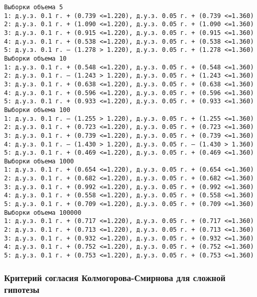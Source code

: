 \documentclass[11pt]{article}
\begin{document}
{\fontsize{11.5}{11}
    \begin{Verbatim}[commandchars=\\\{\}]
Выборки объема 5
1: д.у.з. 0.1 г. + (0.739 <=1.220), д.у.з. 0.05 г. + (0.739 <=1.360)
2: д.у.з. 0.1 г. + (1.090 <=1.220), д.у.з. 0.05 г. + (1.090 <=1.360)
3: д.у.з. 0.1 г. + (0.915 <=1.220), д.у.з. 0.05 г. + (0.915 <=1.360)
4: д.у.з. 0.1 г. + (0.538 <=1.220), д.у.з. 0.05 г. + (0.538 <=1.360)
5: д.у.з. 0.1 г. – (1.278 > 1.220), д.у.з. 0.05 г. + (1.278 <=1.360)
Выборки объема 10
1: д.у.з. 0.1 г. + (0.548 <=1.220), д.у.з. 0.05 г. + (0.548 <=1.360)
2: д.у.з. 0.1 г. – (1.243 > 1.220), д.у.з. 0.05 г. + (1.243 <=1.360)
3: д.у.з. 0.1 г. + (0.638 <=1.220), д.у.з. 0.05 г. + (0.638 <=1.360)
4: д.у.з. 0.1 г. + (0.596 <=1.220), д.у.з. 0.05 г. + (0.596 <=1.360)
5: д.у.з. 0.1 г. + (0.933 <=1.220), д.у.з. 0.05 г. + (0.933 <=1.360)
Выборки объема 100
1: д.у.з. 0.1 г. – (1.255 > 1.220), д.у.з. 0.05 г. + (1.255 <=1.360)
2: д.у.з. 0.1 г. + (0.723 <=1.220), д.у.з. 0.05 г. + (0.723 <=1.360)
3: д.у.з. 0.1 г. + (0.739 <=1.220), д.у.з. 0.05 г. + (0.739 <=1.360)
4: д.у.з. 0.1 г. – (1.430 > 1.220), д.у.з. 0.05 г. – (1.430 > 1.360)
5: д.у.з. 0.1 г. + (0.469 <=1.220), д.у.з. 0.05 г. + (0.469 <=1.360)
Выборки объема 1000
1: д.у.з. 0.1 г. + (0.654 <=1.220), д.у.з. 0.05 г. + (0.654 <=1.360)
2: д.у.з. 0.1 г. + (0.682 <=1.220), д.у.з. 0.05 г. + (0.682 <=1.360)
3: д.у.з. 0.1 г. + (0.992 <=1.220), д.у.з. 0.05 г. + (0.992 <=1.360)
4: д.у.з. 0.1 г. + (0.558 <=1.220), д.у.з. 0.05 г. + (0.558 <=1.360)
5: д.у.з. 0.1 г. + (0.709 <=1.220), д.у.з. 0.05 г. + (0.709 <=1.360)
Выборки объема 100000
1: д.у.з. 0.1 г. + (0.717 <=1.220), д.у.з. 0.05 г. + (0.717 <=1.360)
2: д.у.з. 0.1 г. + (0.713 <=1.220), д.у.з. 0.05 г. + (0.713 <=1.360)
3: д.у.з. 0.1 г. + (0.932 <=1.220), д.у.з. 0.05 г. + (0.932 <=1.360)
4: д.у.з. 0.1 г. + (0.752 <=1.220), д.у.з. 0.05 г. + (0.752 <=1.360)
5: д.у.з. 0.1 г. + (0.753 <=1.220), д.у.з. 0.05 г. + (0.753 <=1.360)
\end{Verbatim}
}

    \hypertarget{ux43aux440ux438ux442ux435ux440ux438ux439-ux441ux43eux433ux43bux430ux441ux438ux44f-ux43aux43eux43bux43cux43eux433ux43eux440ux43eux432ux430-ux441ux43cux438ux440ux43dux43eux432ux430-ux434ux43bux44f-ux441ux43bux43eux436ux43dux43eux439-ux433ux438ux43fux43eux442ux435ux437ux44b}{%
\subsubsection*{Критерий согласия Колмогорова-Смирнова для сложной
гипотезы}\label{ux43aux440ux438ux442ux435ux440ux438ux439-ux441ux43eux433ux43bux430ux441ux438ux44f-ux43aux43eux43bux43cux43eux433ux43eux440ux43eux432ux430-ux441ux43cux438ux440ux43dux43eux432ux430-ux434ux43bux44f-ux441ux43bux43eux436ux43dux43eux439-ux433ux438ux43fux43eux442ux435ux437ux44b}}
\end{document}
